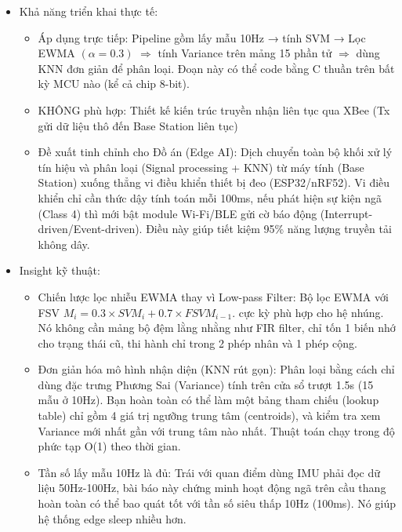 \documentclass[../DoAn.tex]{subfiles}
\begin{document}
\begin{enumerate}[label=\arabic*)]
\begin{itemize}
\begin{itemize}
            \item Thiết kế hệ thống hiện tại bị bottleneck ở truyền thông: Gửi toàn bộ dữ liệu raw ở tần số 10Hz qua sóng không dây về máy tính xử lý. Việc này sẽ làm pin cạn kiệt rất nhanh, không khả thi cho wearable chạy pin dài ngày.
        \end{itemize}
        \item Khả năng triển khai thực tế:
        \begin{itemize}
            \item Áp dụng trực tiếp: Pipeline gồm lấy mẫu 10Hz → tính SVM → Lọc EWMA $(\alpha=0.3)$ $\Longrightarrow$ tính Variance trên mảng 15 phần tử $\Longrightarrow$ dùng KNN đơn giản để phân loại. Đoạn này có thể code bằng C thuần trên bất kỳ MCU nào (kể cả chip 8-bit).
            \item KHÔNG phù hợp: Thiết kế kiến trúc truyền nhận liên tục qua XBee (Tx gửi dữ liệu thô đến Base Station liên tục)
            \item Đề xuất tinh chỉnh cho Đồ án (Edge AI): Dịch chuyển toàn bộ khối xử lý tín hiệu và phân loại (Signal processing + KNN) từ máy tính (Base Station) xuống thẳng vi điều khiển thiết bị đeo (ESP32/nRF52). Vi điều khiển chỉ cần thức dậy tính toán mỗi 100ms, nếu phát hiện sự kiện ngã (Class 4) thì mới bật module Wi-Fi/BLE gửi cờ báo động (Interrupt-driven/Event-driven). Điều này giúp tiết kiệm 95\% năng lượng truyền tải không dây.
        \end{itemize}
        \item Insight kỹ thuật:
        \begin{itemize}
            \item Chiến lược lọc nhiễu EWMA thay vì Low-pass Filter: Bộ lọc EWMA với FSV $M_i=0.3×SVM_i+0.7×FSV M_{i-1}$. cực kỳ phù hợp cho hệ nhúng. Nó không cần mảng bộ đệm lằng nhằng như FIR filter, chỉ tốn 1 biến nhớ cho trạng thái cũ, thi hành chỉ trong 2 phép nhân và 1 phép cộng.
            \item Đơn giản hóa mô hình nhận diện (KNN rút gọn): Phân loại bằng cách chỉ dùng đặc trưng Phương Sai (Variance) tính trên cửa sổ trượt 1.5s (15 mẫu ở 10Hz). Bạn hoàn toàn có thể làm một bảng tham chiếu (lookup table) chỉ gồm 4 giá trị ngưỡng trung tâm (centroids), và kiểm tra xem Variance mới nhất gần với trung tâm nào nhất. Thuật toán chạy trong độ phức tạp O(1) theo thời gian.
            \item Tần số lấy mẫu 10Hz là đủ: Trái với quan điểm dùng IMU phải đọc dữ liệu 50Hz-100Hz, bài báo này chứng minh hoạt động ngã trên cầu thang hoàn toàn có thể bao quát tốt với tần số siêu thấp 10Hz (100ms). Nó giúp hệ thống edge sleep nhiều hơn.
        \end{itemize}
    \end{itemize}
\end{enumerate}
\end{document}
